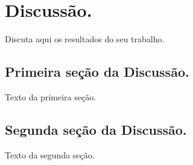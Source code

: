 \chapter{Discussão.}

Discuta aqui os resultados do seu trabalho.

\section{Primeira seção da Discussão.}

Texto da primeira seção.

\section{Segunda seção da Discussão.}

Texto da segunda seção.
